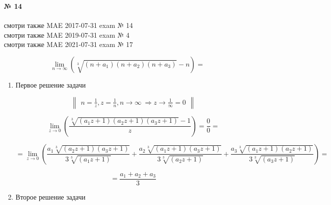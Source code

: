 \documentclass{article}
\begin{document}
\textbf{№ 14} 
\\
\\ смотри также {\color{red}MAE} 2017-07-31 exam № 14
\\ смотри также {\color{red}MAE} 2019-07-31 exam № 4
\\ смотри также {\color{red}MAE} 2021-07-31 exam № 17

\begingroup
$$ \lim_{n\to \infty} \left( \sqrt[3]{(n+a_1)(n+a_2)(n+a_3)} - n \right) 
= $$

\begin{enumerate}
\item Первое решение задачи

$$ \begin{Vmatrix} n=\frac{1}{z}, z=\frac{1}{n}, n\to \infty \ \Rightarrow z\to\frac{1}{\infty}=0 \end{Vmatrix} $$

$$ \lim_{z\to 0} \left(\frac{\sqrt[3]{(a_1z+1)(a_2z+1)(a_3z+1)} - 1}{z} \right) 
= \frac{0}{0}
= $$

$$ = \lim_{z\to 0} \left( \frac{a_1\sqrt[3]{(a_2z+1)(a_3z+1)}}{3\sqrt[3]{(a_1z+1)}} 
+ \frac{a_2\sqrt[3]{(a_1z+1)(a_3z+1)}}{3\sqrt[3]{(a_2z+1)}} 
+ \frac{a_3\sqrt[3]{(a_1z+1)(a_2z+1)}}{3\sqrt[3]{(a_3z+1)}} \right)
= $$

$$ = \frac{a_1+a_2+a_3}{3} $$

\item Второе решение задачи

\end{enumerate}
\endgroup
\end{document}

